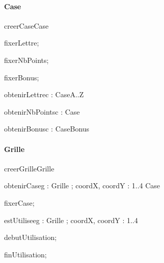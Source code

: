 \paragraph{Case}
\begin{algorithme}
  \signaturefonction
  {creerCase}{}{Case}

  \signatureprocedure
  {fixerLettre}{; }

  \signatureprocedure
  {fixerNbPoints}{; }

  \signatureprocedure
  {fixerBonus}{; }

  \signaturefonction
  {obtenirLettre}{c : Case}{A..Z}

  \signaturefonction
  {obtenirNbPoints}{c : Case}{\naturelNonNul}

  \signaturefonction
  {obtenirBonus}{c : Case}{Bonus}
\end{algorithme}

\paragraph{Grille}
\begin{algorithme}
  \signaturefonction
  {creerGrille}{}{Grille}

  \signaturefonction
  {obtenirCase}{g : Grille ; coordX, coordY : 1..4 }{Case}

  \signatureprocedure
  {fixerCase}{; }

  \signaturefonction
  {estUtilisee}{g : Grille ; coordX, coordY : 1..4}{\booleen}

  \signatureprocedure
  {debutUtilisation}{; }

  \signatureprocedure
  {finUtilisation}{; }

\end{algorithme}
